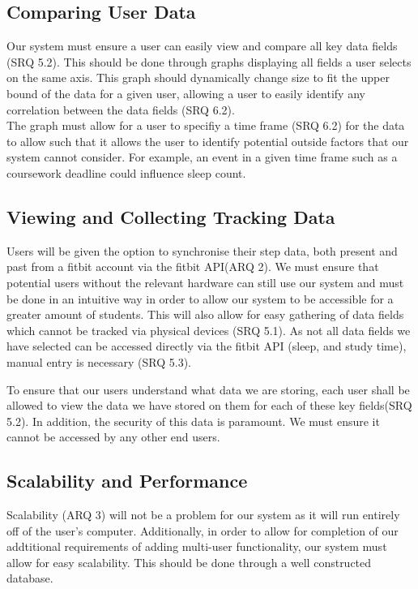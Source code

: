 \documentclass[12pt]{article}
\begin{document}
\subsection{Comparing User Data}

Our system must ensure a user can easily view and compare all key data fields (SRQ 5.2). This should be 
done through graphs displaying all fields a user selects on the same axis. 
This graph should dynamically change size to fit the upper bound of the data for a given user, 
allowing a user to easily identify any correlation between the data fields (SRQ 6.2).\\

The graph must allow for a user to 
specifiy a time frame (SRQ 6.2) for the data to allow such that 
it allows the user to identify potential outside factors
that our system cannot consider. For example, an event in a given time frame
such as a coursework deadline could influence sleep count. 


\subsection{Viewing and Collecting Tracking Data}

Users will be given the option to synchronise their step data, both present and past from a fitbit account via the fitbit API(ARQ 2). 
We must ensure that potential users without the
relevant hardware can still use our system and must be done in an intuitive way
in order to allow our system to be accessible for a greater amount of students.
This will also allow for easy gathering of data fields which cannot be tracked
via physical devices (SRQ 5.1). As not all data fields we have selected can be accessed
directly via the fitbit API (sleep, and study time), manual entry is
necessary (SRQ 5.3).\newline

To ensure that our users understand what data we are storing, each user shall
be allowed to view the data we have stored on them for each of these key
fields(SRQ 5.2). In addition, the security of this data is paramount. We must ensure it
cannot be accessed by any other end users.


\subsection{Scalability and Performance}

Scalability (ARQ 3) will not be a problem for our system as it will run entirely off of the
user's computer.
Additionally, in order to allow for completion of our addtitional requirements of adding multi-user functionality, 
our system must allow for easy scalability. This should be done through a well constructed database.\\
\end{document}
